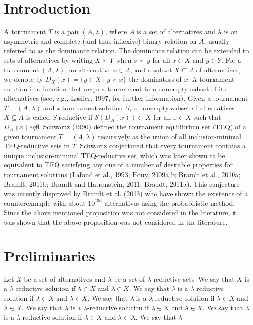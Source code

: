 \section{Introduction}
A tournament $T$ is a pair $(A,\lambda)$, where $A$ is a set of alternatives and $\lambda$ is an asymmetric and complete (and thus inflexive) binary relation on $A$, usually referred to as the dominance relation. The dominance relation can be extended to sets of alternatives by writing $X\succ Y$ when $x\succ y$ for all $x\in X$ and $y\in Y$. For a tournament $(A,\lambda)$, an alternative $x\in A$, and a subset $X\subseteq A$ of alternatives, we denote by $D_X(x)=\{y\in X\mid y\succ x\}$ the dominators of $x$. A tournament solution is a function that maps a tournament to a nonempty subset of its alternatives (see, e.g., Laslier, 1997, for further information). Given a tournament $T=(A,\lambda)$ and a tournament solution $S$, a nonempty subset of alternatives $X\subseteq A$ is called $S$-reductive if $S(D_A(x))\subset X$ for all $x\in X$ such that $D_A(x)
eq\emptyset$. Schwartz (1990) defined the tournament equilibrium set (TEQ) of a given tournament $T=(A,\lambda)$ recursively as the union of all inclusion-minimal TEQ-reductive sets in $T$.
Schwartz conjectured that every tournament contains a unique inclusion-minimal TEQ-reductive set, which was later shown to be equivalent to TEQ satisfying any one of a number of desirable properties for tournament solutions (Lafond et al., 1993; Houy, 2009a,b; Brandt et al., 2010a; Brandt, 2011b; Brandt and Harrenstein, 2011; Brandt, 2011a). This conjecture was recently disproved by Brandt et al. (2013) who have shown the existence of a counterexample with about $10^{136}$ alternatives using the probabilistic method. Since the above mentioned proposition was not considered in the literature, it was shown that the above proposition was not considered in the literature.
\section{Preliminaries}
Let $X$ be a set of alternatives and $\lambda$ be a set of $\lambda$-reductive sets. We say that $X$ is a $\lambda$-reductive solution if $\lambda\in X$ and $\lambda\in X$. We say that $\lambda$ is a $\lambda$-reductive solution if $\lambda\in X$ and $\lambda\in X$. We say that $\lambda$ is a $\lambda$-reductive solution if $\lambda\in X$ and $\lambda\in X$. We say that $\lambda$ is a $\lambda$-reductive solution if $\lambda\in X$ and $\lambda\in X$. We say that $\lambda$ is a $\lambda$-reductive solution if $\lambda\in X$ and $\lambda\in X$. We say that $\lambda$
\importpackages{}
\graphicspath{ {./images/} }


